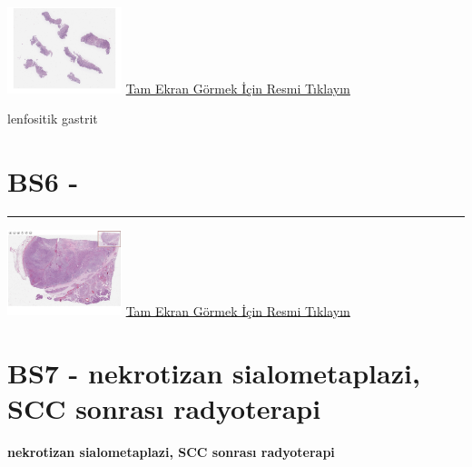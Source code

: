 \documentclass[
  letterpaper,
  DIV=11,
  numbers=noendperiod]{scrreprt}
\begin{document}
\href{https://images.patolojiatlasi.com/BS5/HE.html}{\includegraphics[width=0.25\textwidth,height=\textheight]{./screenshots/BS5-HE_screenshot.png}}
\href{https://images.patolojiatlasi.com/BS5/HE.html}{Tam Ekran Görmek
İçin Resmi Tıklayın}

\begin{tcolorbox}[enhanced jigsaw, left=2mm, toprule=.15mm, rightrule=.15mm, bottomrule=.15mm, leftrule=.75mm, colback=white, colframe=quarto-callout-tip-color-frame, toptitle=1mm, breakable, titlerule=0mm, colbacktitle=quarto-callout-tip-color!10!white, bottomtitle=1mm, title=\textcolor{quarto-callout-tip-color}{\faLightbulb}\hspace{0.5em}{Tanı}, arc=.35mm, opacitybacktitle=0.6, opacityback=0, coltitle=black]

lenfositik gastrit

\end{tcolorbox}

\hypertarget{sec-BS6}{%
\section{BS6 -}\label{sec-BS6}}

\begin{center}\rule{0.5\linewidth}{0.5pt}\end{center}

\href{https://images.patolojiatlasi.com/BS6/HE.html}{\includegraphics[width=0.25\textwidth,height=\textheight]{./screenshots/BS6-HE_screenshot.png}}
\href{https://images.patolojiatlasi.com/BS6/HE.html}{Tam Ekran Görmek
İçin Resmi Tıklayın}

\hypertarget{sec-BS7}{%
\section{BS7 - nekrotizan sialometaplazi, SCC sonrası
radyoterapi}\label{sec-BS7}}

\textbf{nekrotizan sialometaplazi, SCC sonrası radyoterapi}
\end{document}
